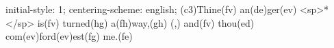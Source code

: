 initial-style: 1;
centering-scheme: english;
(c3)Thine(fv) an(de)ger(ev) <sp>*</sp> is(fv) turned(hg) a(fh)way,(gh) (,) and(fv) thou(ed) com(ev)ford(ev)est(fg) me.(fe)
